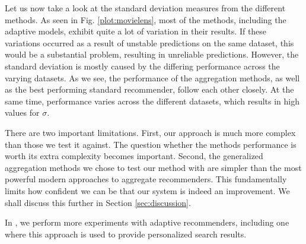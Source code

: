 Let us now take a look at the standard deviation measures from the different methods.
As seen in Fig. \ref{plot:movielens}, 
most of the methods, including the adaptive models,
exhibit quite a lot of variation in their results.
If these variations occurred as a result of unstable
predictions on the same dataset, this would be a substantial problem,
resulting in unreliable predictions.
However, the standard deviation is mostly caused by the differing
performance across the varying datasets.
As we see, the performance of the aggregation methods,
as well as the best performing standard recommender,
follow each other closely. At the same time,
performance varies across the different datasets,
which results in high values for $\sigma$.

There are two important limitations.
First, our approach is much more complex than those we test it against.
The question whether the methods performance is worth its extra complexity becomes important.
Second, the generalized aggregation methods we chose to test our method with
are simpler than the most powerful modern approaches to aggregate recommenders.
This fundamentally limits how confident we can be that our system
is indeed an improvement.
We shall discuss this further in Section \ref{sec:discussion}.

In \cite{Bjorkoy2011}, we perform more experiments with adaptive recommenders,
including one where this approach is used to provide personalized search results.


